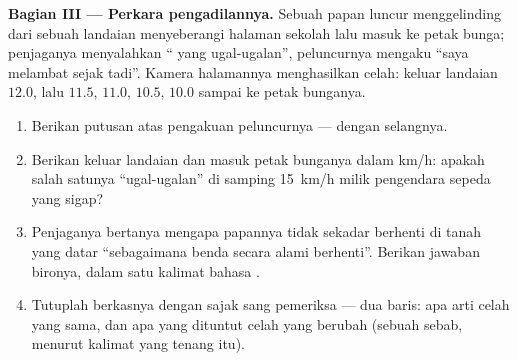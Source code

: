 \begin{problem}
\medskip\noindent\textbf{Bagian III --- Perkara pengadilannya.}
Sebuah papan luncur menggelinding dari sebuah landaian menyeberangi
halaman sekolah lalu masuk ke petak bunga; penjaganya menyalahkan
`` yang ugal-ugalan'', peluncurnya mengaku ``saya melambat
sejak tadi''. Kamera halamannya menghasilkan celah: keluar landaian
$12.0$, lalu $11.5$, $11.0$, $10.5$, $10.0$ sampai ke petak bunganya.
\begin{enumerate}[resume]
  \item Berikan putusan atas pengakuan peluncurnya --- dengan 
        selangnya.
  \item Berikan  keluar landaian dan  masuk petak
        bunganya dalam \unit{km/h}: apakah salah satunya
        ``ugal-ugalan'' di samping \qty{15}{km/h} milik pengendara
        sepeda yang sigap?
  \item Penjaganya bertanya mengapa papannya tidak sekadar berhenti
        di tanah yang datar ``sebagaimana benda secara alami
        berhenti''. Berikan jawaban bironya, dalam satu kalimat
        bahasa .
  \item Tutuplah berkasnya dengan sajak sang pemeriksa --- dua baris:
        apa arti celah yang sama, dan apa yang dituntut celah yang
        berubah (sebuah sebab, menurut kalimat yang tenang itu).
\end{enumerate}
\end{problem}
